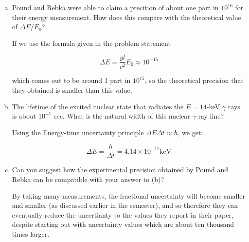 \documentclass[10pt]{article}
\begin{document}
    \begin{enumerate}[(a)]
        \item Pound and Rebka were able to claim a precition of about one part in $10^{16}$ for their energy measurement. How does this compare with the theoretical value of $\Delta E/E_0$?
        
        \begin{solution}
            If we use the formula given in the problem statement

            \[ \Delta E = \frac{gl}{c^2} E_0 \approx 10^{-15}\] 

            which comes out to be around 1 part in $10^{15}$, so the theoretical precision that they obtained is smaller than this value. 
        \end{solution}
        \item The lifetime of the excited nuclear state that radiates the $E = 14$-keV $\gamma$ rays is about $10^{-7}$ sec. What is the natural width of this nuclear $\gamma$-ray line? 
        
        \begin{solution}
            Using the Energy-time uncertainty principle $\Delta E \Delta t \approx \hbar$, we get: 

            \[ \Delta E = \frac{h}{\Delta t} =4.14 \times 10^{-11} \text{keV}\] 
        \end{solution}

        \item Can you suggest how the experimental precision obtained by Pound and Rebka can be compatible with your answer to (b)? 
        
        \begin{solution}
            By taking many measurements, the fractional uncertainty will become smaller and smaller (as discussed earlier in the semester), and so therefore they can eventually reduce the uncertianty to the values they report in their paper, despite starting out with uncertainty values which are about ten thousand times larger. 
        \end{solution}
    \end{enumerate}
\end{document}
